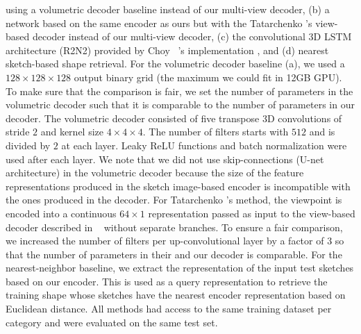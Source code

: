 \documentclass[10pt, conference, compsocconf]{IEEEtran}
\begin{document}
using a volumetric decoder baseline instead of our multi-view decoder, (b) a network based on the same encoder as ours but
 with the
Tatarchenko \etal's view-based decoder \cite{tatarchenko2016multi} instead of our multi-view decoder, (c) the convolutional 3D LSTM architecture (R2N2) provided by Choy \etal~'s implementation \cite{choy20163d}, and (d) nearest sketch-based shape retrieval. For the volumetric decoder baseline (a), we used a $128 \times 128 \times 128$ output binary grid (the maximum we could fit in 12GB GPU\memory). To make sure that the comparison is fair, we set the number of parameters in the volumetric decoder such that it is comparable to the number of parameters in our decoder. The volumetric decoder  consisted of five transpose 3D convolutions of stride $2$ and kernel size $4 \times 4 \times 4$. The number of filters  starts with $512$ and is divided by $2$ at each layer.  Leaky ReLU functions and batch normalization were used after each layer. We note that we did not use  skip-connections (U-net architecture) in the volumetric decoder because the size of the feature representations produced in the sketch image-based encoder is incompatible with the ones produced in the decoder. For Tatarchenko \etal's method,  the viewpoint is encoded into a continuous $64 \times 1$  representation  passed as input to the view-based decoder described in ~\cite{tatarchenko2016multi} without separate branches. To ensure a fair comparison, we increased the number of filters per  up-convolutional layer by a factor of $3$ so that the number of parameters in their and our decoder is comparable.   
For the nearest-neighbor baseline, we  extract the representation of the input test sketches based on our encoder. This is used as a query representation to retrieve the training shape whose sketches have the nearest  encoder representation  based on Euclidean distance. All methods had access to the same training dataset per category and were evaluated on the same test set.
\end{document}
